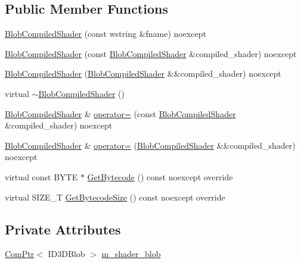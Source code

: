 \subsection*{Public Member Functions}
\begin{DoxyCompactItemize}
\item 
\mbox{\hyperlink{classmage_1_1rendering_1_1_blob_compiled_shader_a9e29ef4b735ae26f6902077d9e7c4f1d}{Blob\+Compiled\+Shader}} (const wstring \&fname) noexcept
\item 
\mbox{\hyperlink{classmage_1_1rendering_1_1_blob_compiled_shader_a7b63a87261abf6059c957af4061af201}{Blob\+Compiled\+Shader}} (const \mbox{\hyperlink{classmage_1_1rendering_1_1_blob_compiled_shader}{Blob\+Compiled\+Shader}} \&compiled\+\_\+shader) noexcept
\item 
\mbox{\hyperlink{classmage_1_1rendering_1_1_blob_compiled_shader_afa58cbbad81febc6c2470f6f1b0de2ce}{Blob\+Compiled\+Shader}} (\mbox{\hyperlink{classmage_1_1rendering_1_1_blob_compiled_shader}{Blob\+Compiled\+Shader}} \&\&compiled\+\_\+shader) noexcept
\item 
virtual \mbox{\hyperlink{classmage_1_1rendering_1_1_blob_compiled_shader_ac983a2506dfe81e8e8ceb2b9ffa420d6}{$\sim$\+Blob\+Compiled\+Shader}} ()
\item 
\mbox{\hyperlink{classmage_1_1rendering_1_1_blob_compiled_shader}{Blob\+Compiled\+Shader}} \& \mbox{\hyperlink{classmage_1_1rendering_1_1_blob_compiled_shader_a07f7bf56354508ad499133b821e2fdc5}{operator=}} (const \mbox{\hyperlink{classmage_1_1rendering_1_1_blob_compiled_shader}{Blob\+Compiled\+Shader}} \&compiled\+\_\+shader) noexcept
\item 
\mbox{\hyperlink{classmage_1_1rendering_1_1_blob_compiled_shader}{Blob\+Compiled\+Shader}} \& \mbox{\hyperlink{classmage_1_1rendering_1_1_blob_compiled_shader_a14954683e57897937b0e0178b5a726a4}{operator=}} (\mbox{\hyperlink{classmage_1_1rendering_1_1_blob_compiled_shader}{Blob\+Compiled\+Shader}} \&\&compiled\+\_\+shader) noexcept
\item 
virtual const B\+Y\+TE $\ast$ \mbox{\hyperlink{classmage_1_1rendering_1_1_blob_compiled_shader_a4d7f3d2d9864cb12939386ff031bd783}{Get\+Bytecode}} () const noexcept override
\item 
virtual S\+I\+Z\+E\+\_\+T \mbox{\hyperlink{classmage_1_1rendering_1_1_blob_compiled_shader_ac3c3edb09ba96367f8c5d6741ec03041}{Get\+Bytecode\+Size}} () const noexcept override
\end{DoxyCompactItemize}
\subsection*{Private Attributes}
\begin{DoxyCompactItemize}
\item 
\mbox{\hyperlink{namespacemage_ae74f374780900893caa5555d1031fd79}{Com\+Ptr}}$<$ I\+D3\+D\+Blob $>$ \mbox{\hyperlink{classmage_1_1rendering_1_1_blob_compiled_shader_ad28d77dc5fd97d127c2e2dc875384449}{m\+\_\+shader\+\_\+blob}}
\end{DoxyCompactItemize}
